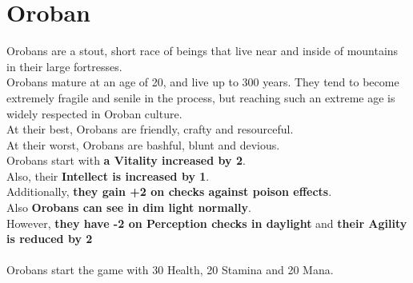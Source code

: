 \section{Oroban}
Orobans are a stout, short race of beings that live near and inside of mountains in their large fortresses.\\
Orobans mature at an age of 20, and live up to 300 years. They tend to become extremely fragile and senile in the process, but reaching such an extreme age is widely respected in Oroban culture.\\
At their best, Orobans are friendly, crafty and resourceful.\\
At their worst, Orobans are bashful, blunt and devious.\\
Orobans start with \textbf{a Vitality increased by 2}.\\
Also, their \textbf{Intellect is increased by 1}.\\
Additionally, \textbf{they gain +2 on checks against poison effects}.\\
Also \textbf{Orobans can see in dim light normally}.\\
However, \textbf{they have -2 on Perception checks in daylight} and \textbf{their Agility is reduced by 2}\\\\
Orobans start the game with 30 Health, 20 Stamina and 20 Mana.\\
